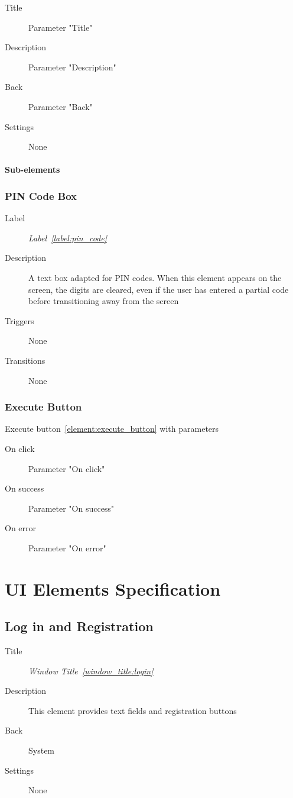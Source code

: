 \documentclass[a4paper,10pt]{article}
\newcommand{\windowTitleLabelText}{Window Title}
\newcommand{\windowTitleLabel}{window_title:}
\DeclareRobustCommand{\windowTitleRef}[1]{%
   \emph{\windowTitleLabelText~\ref{\windowTitleLabel#1}}}
\newcommand{\labelLabelText}{Label}
\newcommand{\labelLabel}{label:}
\DeclareRobustCommand{\labelRef}[1]{%
   \emph{\labelLabelText~\ref{\labelLabel#1}}}
\newcommand{\elementLabel}{element:}
\DeclareRobustCommand{\element}[2]{\subsection{#1}\label{\elementLabel#2}}
\DeclareRobustCommand{\elementRef}[1]{\ref{\elementLabel#1}}
\begin{document}
\begin{description}
 \item[Title] Parameter "Title"
 \item[Description] Parameter "Description"
 \item[Back] Parameter "Back"
 \item[Settings] None
\end{description}

\paragraph{Sub-elements}

\subsubsection{PIN Code Box}
\begin{description}
 \item[Label] \labelRef{pin_code}
 \item[Description] A text box adapted for PIN codes. When this element appears 
on the screen, the digits are cleared, even if the user has entered a partial 
code before transitioning away from the screen
 \item[Triggers] None
 \item[Transitions] None
\end{description}

\subsubsection{Execute Button}
Execute button~\elementRef{execute_button} with parameters
\begin{description}
 \item[On click] Parameter "On click"
 \item[On success] Parameter "On success"
 \item[On error] Parameter "On error"
\end{description}

\section{UI Elements Specification}
\label{sec:element_spec}

\element{Log in and Registration}{login}
\begin{description}
 \item[Title] \windowTitleRef{login}
 \item[Description] This element provides text fields and registration buttons
 \item[Back] System
 \item[Settings] None
\end{description}
\end{document}
